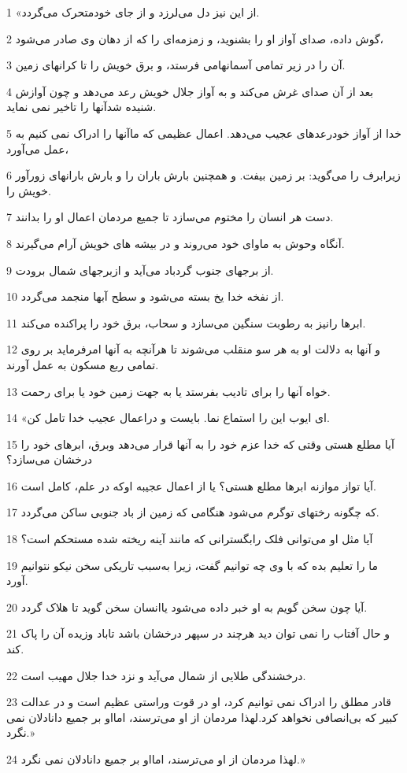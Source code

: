 \par 1 «از این نیز دل می‌لرزد و از جای خودمتحرک می‌گردد.
\par 2 گوش داده، صدای آواز او را بشنوید، و زمزمه‌ای را که از دهان وی صادر می‌شود،
\par 3 آن را در زیر تمامی آسمانهامی فرستد، و برق خویش را تا کرانهای زمین.
\par 4 بعد از آن صدای غرش می‌کند و به آواز جلال خویش رعد می‌دهد و چون آوازش شنیده شدآنها را تاخیر نمی نماید.
\par 5 خدا از آواز خودرعدهای عجیب می‌دهد. اعمال عظیمی که ماآنها را ادراک نمی کنیم به عمل می‌آورد،
\par 6 زیرابرف را می‌گوید: بر زمین بیفت. و همچنین بارش باران را و بارش بارانهای زورآور خویش را.
\par 7 دست هر انسان را مختوم می‌سازد تا جمیع مردمان اعمال او را بدانند.
\par 8 آنگاه وحوش به ماوای خود می‌روند و در بیشه های خویش آرام می‌گیرند.
\par 9 از برجهای جنوب گردباد می‌آید و ازبرجهای شمال برودت.
\par 10 از نفخه خدا یخ بسته می‌شود و سطح آبها منجمد می‌گردد.
\par 11 ابرها رانیز به رطوبت سنگین می‌سازد و سحاب، برق خود را پراکنده می‌کند.
\par 12 و آنها به دلالت او به هر سو منقلب می‌شوند تا هرآنچه به آنها امرفرماید بر روی تمامی ربع مسکون به عمل آورند.
\par 13 خواه آنها را برای تادیب بفرستد یا به جهت زمین خود یا برای رحمت.
\par 14 «ای ایوب این را استماع نما. بایست و دراعمال عجیب خدا تامل کن.
\par 15 آیا مطلع هستی وقتی که خدا عزم خود را به آنها قرار می‌دهد وبرق، ابرهای خود را درخشان می‌سازد؟
\par 16 آیا تواز موازنه ابرها مطلع هستی؟ یا از اعمال عجیبه اوکه در علم، کامل است.
\par 17 که چگونه رختهای توگرم می‌شود هنگامی که زمین از باد جنوبی ساکن می‌گردد.
\par 18 آیا مثل او می‌توانی فلک رابگسترانی که مانند آینه ریخته شده مستحکم است؟
\par 19 ما را تعلیم بده که با وی چه توانیم گفت، زیرا به‌سبب تاریکی سخن نیکو نتوانیم آورد.
\par 20 آیا چون سخن گویم به او خبر داده می‌شود یاانسان سخن گوید تا هلاک گردد.
\par 21 و حال آفتاب را نمی توان دید هرچند در سپهر درخشان باشد تاباد وزیده آن را پاک کند.
\par 22 درخشندگی طلایی از شمال می‌آید و نزد خدا جلال مهیب است.
\par 23 قادر مطلق را ادراک نمی توانیم کرد، او در قوت وراستی عظیم است و در عدالت کبیر که بی‌انصافی نخواهد کرد.لهذا مردمان از او می‌ترسند، امااو بر جمیع دانادلان نمی نگرد.»
\par 24 لهذا مردمان از او می‌ترسند، امااو بر جمیع دانادلان نمی نگرد.»
 
